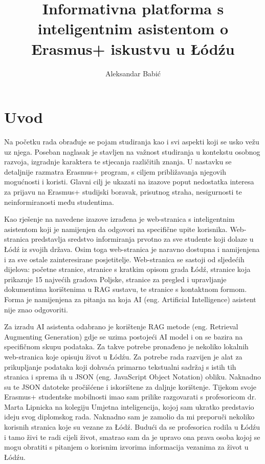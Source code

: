 \documentclass[]{foi}
\title{Informativna platforma s inteligentnim asistentom o Erasmus+ iskustvu u \L\'{o}d\'{z}u}
\author{Aleksandar Babić}
\begin{document}
\maketitle

\tableofcontents

\makeatletter {} \makeatother
\pagestyle{plain}


\chapter{Uvod}
Na početku rada obrađuje se pojam studiranja kao i svi aspekti koji se usko vežu uz njega. Poseban naglasak je stavljen na važnost studiranja u kontekstu osobnog razvoja, izgradnje karaktera
te stjecanja različitih znanja. U nastavku se detaljnije razmatra Erasmus+ program, s ciljem približavanja njegovih mogućnosti i koristi. Glavni cilj je ukazati na izazove poput nedostatka interesa
za prijavu na Erasmus+ studijski boravak, prisutnog straha, nesigurnosti te neinformiranosti među studentima. 

Kao rješenje na navedene izazove izrađena je web-stranica s inteligentnim asistentom koji je namijenjen da odgovori na specifične upite korisnika. Web-stranica predstavlja sredstvo informiranja 
prvotno za sve studente koji dolaze u Łódź iz svojih država. Osim toga web-stranica je naravno dostupna i namijenjena i za sve ostale zainteresirane posjetitelje. Web-stranica se sastoji od 
sljedećih dijelova: početne stranice, stranice s kratkim opisom grada Łódź, stranice koja prikazuje 15 najvećih gradova Poljske, stranice za pregled i upravljanje dokumentima korištenima u 
RAG sustavu, te stranice s kontaktnom formom. Forma je namijenjena za pitanja na koja AI (eng. Artificial Intelligence) asistent nije znao odgovoriti.

Za izradu AI asistenta odabrano je korištenje RAG metode (eng. Retrieval Augmenting Generation) gdje se uzima postojeći AI model i on se bazira na specifičnom skupu podataka. 
Za takve potrebe pronađeno je nekoliko lokalnih web-stranica koje opisuju život u Łódźu. Za potrebe rada razvijen je alat za prikupljanje podataka koji dohvaća primarno tekstualni sadržaj s istih tih stranica
i sprema ih u JSON (eng. JavaScript Object Notation) obliku. Naknadno su te JSON datoteke pročišćene i iskorištene za daljnje korištenje. Tijekom svoje Erasmus+ studentske mobilnosti imao sam prilike razgovarati s profesoricom dr. Marta Lipnicka na 
kolegiju Umjetna inteligencija, kojoj sam ukratko predstavio ideju svog diplomskog rada. Naknadno sam je zamolio da mi preporuči nekoliko korisnih stranica koje su vezane za Łódź. Budući da se profesorica rodila u Łódźu i tamo živi te radi cijeli život, smatrao sam da je upravo ona prava osoba kojoj se mogu obratiti
s pitanjem o korisnim izvorima informacija vezanima za život u Łódźu. 
\end{document}
